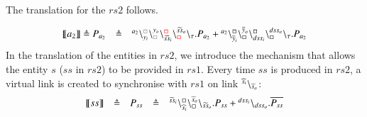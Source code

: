 \begin{example}
\[\begin{array}{lclcl}
\end{array}
\]


%


\noindent
The translation for the $rs2$ follows.

\[
\begin{array}{lcl}
\llbracket a_2\rrbracket \defeq P_{a_2}&\defeq &\startchain{a_2}\chainedlink{y_i}{{\color{gray}\noact}}\chainedlink{{\color{gray}\noact}}{y_o}\chainedlink{\widetilde{ss}_i}{{\color{red}\noact}}\chainedlink{{\color{red}\noact}}{\widetilde{ss}_o}\chainend{\silent}.P_{a_2}+
\startchain{a_2}\chainedlink{\overline{y}_i}{\noact}\chainedlink{\noact}{\overline{y}_o}    
\chainedlink{dss_i}{\noact}\chainedlink{\noact}{dss_o}\chainend{\silent}.P_{a_2}\\
%
\end{array}
\]
\noindent
In the translation of the entities in  $rs2$, we introduce the mechanism that allows the entity
$s$ ($ss$ in $rs2$) to be provided in $rs1$. Every time $ss$ is produced in $rs2$,  a virtual link is
created to synchronise with $rs1$   on link ${}^{\widehat{s}_i} \backslash_{\widehat{s}_o}$:
\[
\begin{array}{lclcl}
\llbracket ss \rrbracket& \triangleq& P_{ss}&\triangleq &{}^{\widetilde{ss}_i}\backslash_{\widehat{s}_i}^{\scriptstyle {\square}}\backslash_{\scriptstyle {\square}}^{\widehat{s}_o}\backslash_{\widetilde{ss}_o}.P_{ss}+
{}^{dss_i}   \backslash_{dss_o}.\overline{P_{ss}} \\



\end{array}\]
\end{example}
